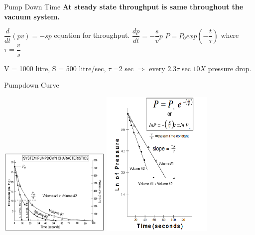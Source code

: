 \documentclass[11]{beamer}
\begin{document}
\begin{frame}{Pump Down Time}
\textbf{At steady state throughput is same throughout the vacuum system.}

$\dfrac{d}{dt}(pv)=-sp $ equation for throughput. \break
$\dfrac{dp}{dt}=-\dfrac{s}{v}p $ \break
$P=P_{0}exp(-\dfrac{t}{\tau})  $ where $ \tau=\dfrac{v}{s} $

\begin{exampleblock}

V = 1000 litre,
S = 500 litre/sec,
$\tau$ =2 sec
$ \Rightarrow $ every $2.3 \tau $ sec $ 10X$ pressure drop.
\end{exampleblock}


\end{frame}

\begin{frame}{Pumpdown Curve}


\begin{center}
		\includegraphics[width=0.4\textwidth]{Pumpdown1.png}
		\includegraphics[width=0.4\textwidth]{Pumpdown2.png}
	\end{center}

\end{frame}
\end{document}

